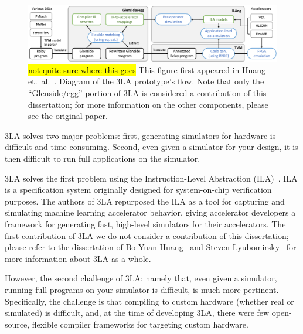 \begin{figure}
    \centering
    \includegraphics[width=\textwidth]{assets/3la-diagram.pdf}
    \caption{
    \hl{not quite sure where this goes}
This figure first appeared
  in Huang et.~al.~\cite{huang2024application}.
Diagram of the 3LA prototype's flow.
Note that only the ``Glenside/egg''
  portion of 3LA
  is considered a contribution
  of this dissertation;
  for more information on the other components,
  please see the original paper.
}
    \label{fig:3la-diagram}
\end{figure}

3LA solves two major problems:
  first, generating simulators
  for hardware
  is difficult
  and time consuming.
Second, even given a simulator
  for your design,
  it is then difficult
  to run full applications
  on the simulator.
  
3LA solves the first problem
  using the Instruction-Level Abstraction (ILA)~\cite{huang2018instruction,huang2018formal}.
ILA is a specification system
  originally designed for
  system-on-chip verification purposes.
The authors of 3LA
  repurposed the ILA
  as a tool for capturing
  and simulating
  machine learning accelerator behavior,
  giving accelerator developers
  a framework for generating fast,
  high-level simulators
  for their accelerators.
The first contribution
  of 3LA
  we do not consider
  a contribution of this dissertation;
  please refer to the dissertation
  of Bo-Yuan Huang~\cite{huang2022instruction}
  and Steven Lyubomirsky~\cite{lyubomirsky2022compiler}
  for more information about 3LA as a whole.

However,
  the second challenge of 3LA:
  namely that, even given a simulator,
  running full programs on your simulator
  is difficult,
  is much more pertinent.
Specifically, the challenge
  is that
  compiling to custom hardware
  (whether real or simulated) is difficult,
  and, at the time of developing 3LA,
  there were few open-source, flexible 
  compiler frameworks
  for targeting custom hardware.

